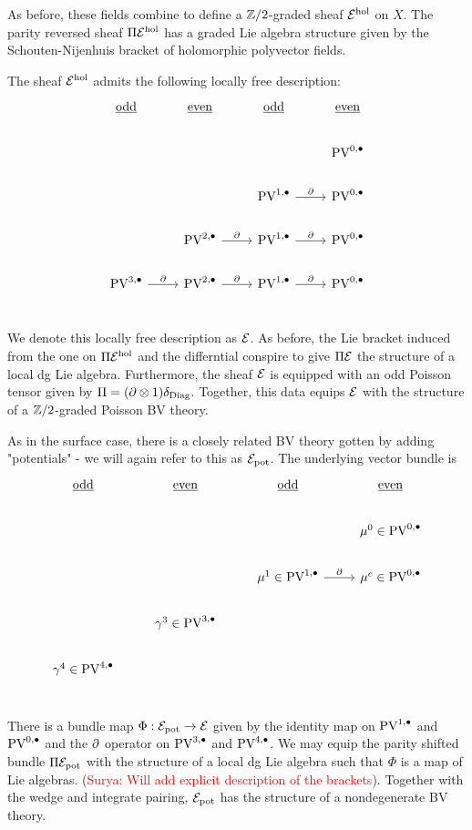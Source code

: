 \documentclass[11pt]{article}
\newcommand{\surya}[1]{(\textcolor{red}{Surya: #1})}
\newcommand\bu{\bullet}
\begin{document}
As before, these fields combine to define a $\mathbb{Z}/2$-graded sheaf $\mathcal{E}^{\rm hol}$ on $X$. The parity reversed sheaf $\Pi\mathcal{E}^{\rm hol}$ has a graded Lie algebra structure given by the Schouten-Nijenhuis bracket of holomorphic polyvector fields.

The sheaf $\mathcal{E}^{\rm hol}$ admits the following locally free description:
\[
\begin{tikzcd}
\ul{\rm odd} & \ul{\rm even} & \ul{\rm odd} & \ul{\rm even} \\
& & & \PV^{0,\bu} \\
& & \PV^{1,\bu} \ar[r, "\partial"] & \PV^{0,\bu} \\
& \PV^{2,\bu} \ar[r,"\del"] & \PV^{1,\bu} \ar[r, "\partial"] & \PV^{0,\bu} \\ 
\PV^{3,\bu}\ar[r, "\del"]& \PV^{2,\bu} \ar[r,"\del"] & \PV^{1,\bu} \ar[r, "\partial"] & \PV^{0,\bu} \\ 
\end{tikzcd}
\]

We denote this locally free description as $\mathcal{E}$. As before, the Lie bracket induced from the one on $\Pi\mathcal{E}^{\rm hol}$ and the differntial conspire to give $\Pi\mathcal{E}$ the structure of a local dg Lie algebra. Furthermore, the sheaf $\mathcal{E}$ is equipped with an odd Poisson tensor given by $\Pi = (\partial\otimes 1)\delta_{\rm Diag}$. Together, this data equips $\mathcal{E}$ with the structure of a $\mathbb{Z}/2$-graded Poisson BV theory.

As in the surface case, there is a closely related BV theory gotten by adding "potentials" - we will again refer to this as $\mathcal{E}_{\rm pot}$. The underlying vector bundle is 
\[
\begin{tikzcd}
\ul{\rm odd} & \ul{\rm even} & \ul{\rm odd} & \ul{\rm even} \\
& & & \mu^{0}\in\PV^{0,\bu} \\
& & \mu^{1}\in\PV^{1,\bu} \ar[r, "\partial"] & \mu^{c}\in\PV^{0,\bu} \\
& \gamma^{3}\in\PV^{3,\bu} & &  \\
\gamma^{4}\in\PV^{4,\bu}&  &  & \\
\end{tikzcd}
\]

There is a bundle map $\Phi: \mathcal{E}_{\rm pot}\to \mathcal{E}$ given by the identity map on $\PV^{1,\bu}$ and $\PV^{0,\bu}$ and the $\partial$ operator on $\PV^{3,\bu}$ and $\PV^{4,\bu}$. We may equip the parity shifted bundle $\Pi\mathcal{E}_{\rm pot}$ with the structure of a local dg Lie algebra such that $\Phi$ is a map of Lie algebras. \surya{Will add explicit description of the brackets}. Together with the wedge and integrate pairing, $\mathcal{E}_{\rm pot}$ has the structure of a nondegenerate BV theory.
\end{document}
